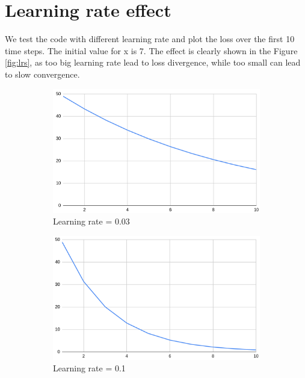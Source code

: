 \documentclass{article}
\begin{document}
\section{Learning rate effect}
We test the code with different learning rate and plot the loss over the first 10 time steps.
The initial value for x is 7.
The effect is clearly shown in the Figure \ref{fig:lrs}, as too big learning rate lead to loss divergence, while too small can lead to slow convergence.
\begin{figure}[H]
\centering
\begin{subfigure}{0.4\textwidth}
    \includegraphics[width=\linewidth]{lr0.03.png}
    \caption{Learning rate = 0.03}
    \label{fig:lr0.03}
\end{subfigure}
\begin{subfigure}{0.4\textwidth}
    \includegraphics[width=\linewidth]{lr0.1.png}
    \caption{Learning rate = 0.1}
    \label{fig:0.1}
\end{subfigure}
\begin{subfigure}{0.4\textwidth}

\end{subfigure}
\end{figure}
\end{document}

